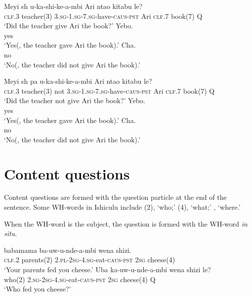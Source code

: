 \documentclass[12pt, oneside]{article}
\let\ipa\textipa
\begin{document}
\begin{exe}
\ex
\begin{xlist}
\ex
\gll Meyi {sh\textramshorns} u-ka-shi-ke-\textbeltl a-mbi Ari nta\textbeltl o kitabu le? \\
\textsc{clf.3} teacher(3) \textsc{3.sg}-\textsc{1.sg}-\textsc{7.sg}-have-\textsc{caus}-\textsc{pst} Ari \textsc{clf.7} book(7) Q \\
\trans `Did the teacher give Ari the book?'
\ex
\gll Yebo. \\
yes \\
\trans `Yes(, the teacher gave Ari the book).'
\ex
\gll Cha. \\
no \\
\trans `No(, the teacher did not give Ari the book).'
\end{xlist}
\ex
\begin{xlist}
\ex
\gll Meyi {sh\textramshorns} pa u-ka-shi-ke-\textbeltl a-mbi Ari nta\textbeltl o kitabu le? \\
\textsc{clf.3} teacher(3) not \textsc{3.sg}-\textsc{1.sg}-\textsc{7.sg}-have-\textsc{caus}-\textsc{pst} Ari \textsc{clf.7} book(7) Q \\
\trans `Did the teacher not give Ari the book?'
\ex
\gll Yebo. \\
yes \\
\trans `Yes(, the teacher gave Ari the book).'
\ex
\gll Cha. \\
no \\
\trans `No(, the teacher did not give Ari the book).'
\end{xlist}
\end{exe}

\section{Content questions}

Content questions are formed with the question particle \textit{\ipa{le}} at the end of the sentence. Some WH-words in Ishiculu include \textit{\ipa{uba}}(2), `who;' \textit{\ipa{uni}}(4), `what;' \textit{\ipa{una}}, `where.'

When the WH-word is the subject, the question is formed with the WH-word \textit{in situ}.

\begin{exe}
\ex
\begin{xlist}
\ex
{} babamama ba-uw-u-nde-\ipa{\textbeltl}a-mbi wena shizi. \\
\textsc{clf.2} parents(2) \textsc{2.pl}-\textsc{2sg}-\textsc{4.sg}-eat-\textsc{caus}-\textsc{pst} \textsc{2sg} cheese(4) \\
\trans `Your parents fed you cheese.'
\ex
\gll Uba ka-uw-u-nde-\ipa{\textbeltl}a-mbi wena shizi le? \\
who(2) \textsc{2.sg}-\textsc{2sg}-\textsc{4.sg}-eat-\textsc{caus}-\textsc{pst} \textsc{2sg} cheese(4) Q \\
\trans `Who fed you cheese?'
\end{xlist}
\end{exe}
\end{document}
